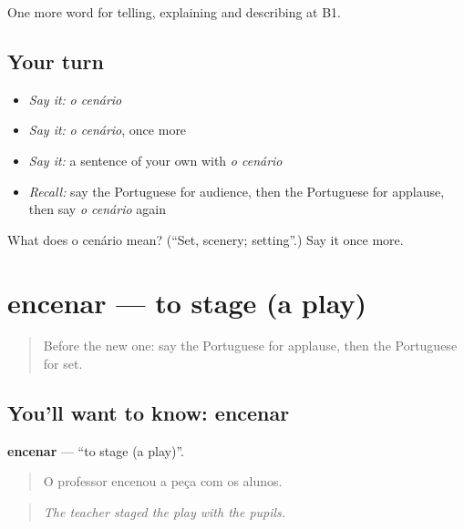 \begin{grammarlens}[title={What you've built}]
One more word for telling, explaining and describing at B1.
\end{grammarlens}

\subsection*{Your turn}
\begin{itemize}
\raggedright
  \item \emph{Say it:} \emph{o cenário}
  \item \emph{Say it:} \emph{o cenário}, once more
  \item \emph{Say it:} a sentence of your own with \emph{o cenário}
  \item \emph{Recall:} say the Portuguese for audience, then the Portuguese for applause, then say \emph{o cenário} again
\end{itemize}

\begin{tcolorbox}[breakable,colback=teal!4,colframe=teal!35!black,title={Before you move on}]
What does o cenário mean? (\textquotedblleft{}Set, scenery; setting\textquotedblright{}.) Say it once more.
\end{tcolorbox}
\section[encenar]{encenar — to stage (a play)}

\label{lesson:PT-C520-encenar}



\begin{quote}
Before the new one: say the Portuguese for applause, then the Portuguese for set.
\end{quote}

\subsection*{You'll want to know: encenar}
\textbf{encenar} — \textquotedblleft{}to stage (a play)\textquotedblright{}.

\begin{quote}
O professor encenou a peça com os alunos.
\end{quote}

\begin{quote}
\emph{The teacher staged the play with the pupils.}
\end{quote}

